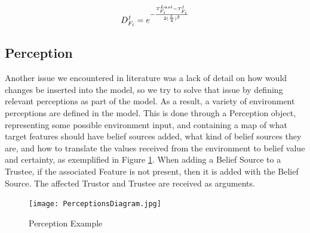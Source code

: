 \begin{equation}
    D^j_{F_i} = e^{-\frac{T^{Last}_{F_i} - T^j_{F_i}}{2(\frac{L}{4})^2}}
\label{eq:TimeValue}
\end{equation}


% 

\subsection{Perception}
Another issue we encountered in literature was a lack of detail on how would changes be inserted into the model, so we try to solve that issue by defining relevant perceptions as part of the model. As a result, a variety of environment perceptions are defined in the model. This is done through a Perception object, representing some possible environment input, and containing a map of what target features should have belief sources added, what kind of belief sources they are, and how to translate the values received from the environment to belief value and certainty, as exemplified in Figure \ref{fig:Perceptions Diagram}. When adding a Belief Source to a Trustee, if the associated Feature is not present, then it is added with the Belief Source. The affected Trustor and Trustee are received as arguments.

\begin{figure}[hbt]
    \centering
    \texttt{[image: PerceptionsDiagram.jpg]}
    \caption{Perception Example}
    \label{fig:Perceptions Diagram}
\end{figure}

